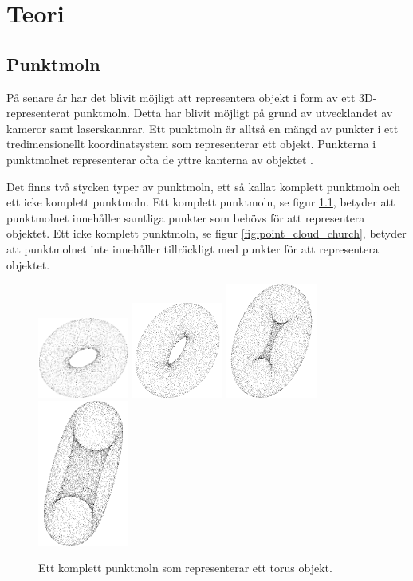 \chapter{Teori}
\label{cha:theory}

\section{Punktmoln}
På senare år har det blivit möjligt att representera objekt i form av ett 3D-representerat punkt\-moln. Detta har blivit möjligt på grund av utvecklandet av kameror samt laserskannrar. Ett punktmoln är alltså en mängd av punkter i ett tredimensionellt koordinatsystem som representerar ett objekt. Punkterna i punktmolnet representerar ofta de yttre kanterna av objektet \cite{point_cloud}.

Det finns två stycken typer av punktmoln, ett så kallat komplett punktmoln och ett icke komplett punktmoln. Ett komplett punktmoln, se figur \ref{fig:point_cloud_torus}, betyder att punktmolnet innehåller samtliga punkter som behövs för att representera objektet. Ett icke komplett punktmoln, se figur \ref{fig:point_cloud_church}, betyder att punktmolnet inte innehåller tillräckligt med punkter för att representera objektet. 

\begin{figure}[H]
	\centering
	\includegraphics[width=30mm]{figures/Point_cloud_torus1.png}
	\includegraphics[width=30mm]{figures/Point_cloud_torus2.png}
	\includegraphics[width=30mm]{figures/Point_cloud_torus3.png}
	\includegraphics[width=30mm]{figures/Point_cloud_torus4.png}
	\caption{Ett komplett punktmoln som representerar ett torus objekt.}
	\label{fig:point_cloud_torus}
\end{figure}

